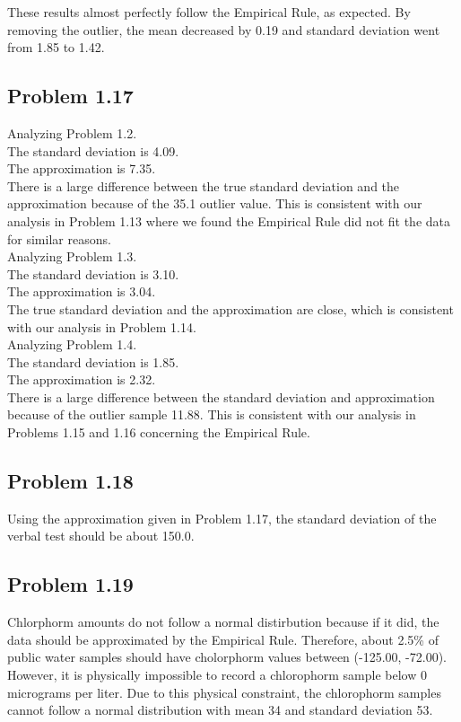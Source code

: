 \documentclass[12pt]{article}
\begin{document}
    \noindent
    These results almost perfectly follow the Empirical Rule, as expected.
    By removing the outlier, the mean decreased by 0.19 and standard deviation went from 1.85 to 1.42.\\

\subsection*{Problem 1.17}
    Analyzing Problem 1.2.\\
    The standard deviation is 4.09.\\
    The approximation is 7.35.\\
    There is a large difference between the true standard deviation and the approximation because of the 35.1 outlier value. This is consistent with our analysis in Problem 1.13 where we found the Empirical Rule did not fit the data for similar reasons.\\
    
    \noindent
    Analyzing Problem 1.3.\\
    The standard deviation is 3.10.\\
    The approximation is 3.04.\\
    The true standard deviation and the approximation are close, which is consistent with our analysis in Problem 1.14.\\
    
    \noindent
    Analyzing Problem 1.4.\\
    The standard deviation is 1.85.\\
    The approximation is 2.32.\\
    There is a large difference between the standard deviation and approximation because of the outlier sample 11.88. This is consistent with our analysis in Problems 1.15 and 1.16 concerning the Empirical Rule.\\
    
\subsection*{Problem 1.18}
    Using the approximation given in Problem 1.17, the standard deviation of the verbal test should be about 150.0.

\subsection*{Problem 1.19}
    Chlorphorm amounts do not follow a normal distirbution because if it did, the data should be approximated by the Empirical Rule.
    Therefore, about 2.5\% of public water samples should have cholorphorm values between (-125.00, -72.00).
    However, it is physically impossible to record a chlorophorm sample below 0 micrograms per liter. Due to this physical constraint, the chlorophorm samples cannot follow a normal distribution with mean 34 and standard deviation 53.
\end{document}
